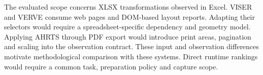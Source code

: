 The evaluated scope concerns XLSX transformations observed in Excel. VISER and
VERVE consume web pages and DOM-based layout reports. Adapting their selectors
would require a spreadsheet-specific dependency and geometry model. Applying
AHRTS through PDF export would introduce print areas, pagination and scaling
into the observation contract. These input and observation differences motivate
methodological comparison with these systems. Direct runtime rankings would
require a common task, preparation policy and capture scope.
